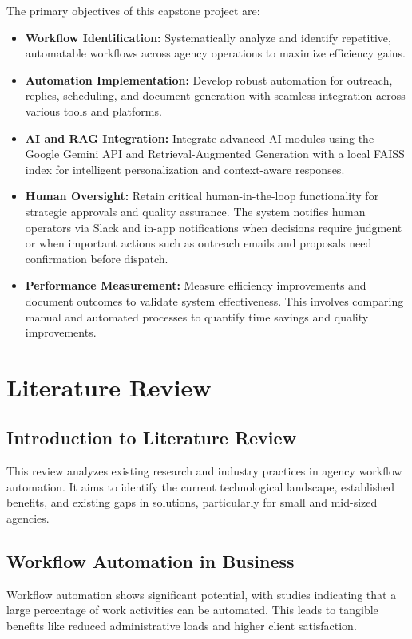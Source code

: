 \documentclass[12pt,a4paper]{report}
\begin{document}
The primary objectives of this capstone project are:

\begin{itemize}
    \item \textbf{Workflow Identification:} Systematically analyze and identify repetitive, automatable workflows across agency operations to maximize efficiency gains.
    \item \textbf{Automation Implementation:} Develop robust automation for outreach, replies, scheduling, and document generation with seamless integration across various tools and platforms.
    \item \textbf{AI and RAG Integration:} Integrate advanced AI modules using the Google Gemini API and Retrieval-Augmented Generation with a local FAISS index for intelligent personalization and context-aware responses.
    \item \textbf{Human Oversight:} Retain critical human-in-the-loop functionality for strategic approvals and quality assurance. The system notifies human operators via Slack and in-app notifications when decisions require judgment or when important actions such as outreach emails and proposals need confirmation before dispatch.
    \item \textbf{Performance Measurement:} Measure efficiency improvements and document outcomes to validate system effectiveness. This involves comparing manual and automated processes to quantify time savings and quality improvements.
\end{itemize}

\section{Literature Review}

\subsection{Introduction to Literature Review}
This review analyzes existing research and industry practices in agency workflow automation. It aims to identify the current technological landscape, established benefits, and existing gaps in solutions, particularly for small and mid-sized agencies.

\subsection{Workflow Automation in Business}
Workflow automation shows significant potential, with studies indicating that a large percentage of work activities can be automated. This leads to tangible benefits like reduced administrative loads and higher client satisfaction.
\end{document}
